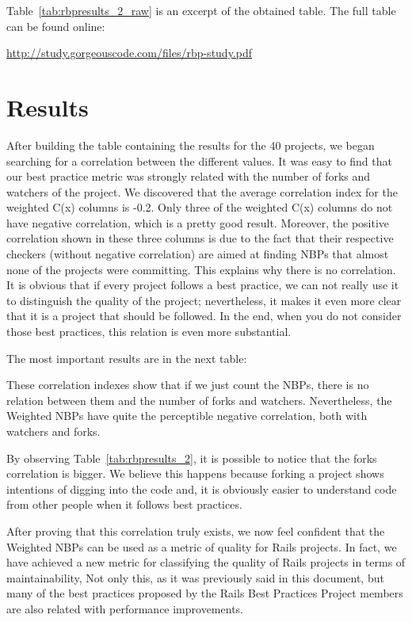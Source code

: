 
Table~\ref{tab:rbpresults_2_raw} is an excerpt of the obtained table. The full table can be found online: 

\url{http://study.gorgeouscode.com/files/rbp-study.pdf}




\section{Results}\label{subsec:results}
After building the table containing the results for the 40 projects, 
we began searching for a correlation between the different values. 
It was easy to find that our best practice metric was strongly related with the number of forks and watchers of the project.
We discovered that the average correlation index for the weighted C(x) columns is -0.2. 
Only three of the weighted C(x) columns do not have negative correlation, which is a pretty good result. 
Moreover, the positive correlation shown in these three columns
is due to the fact that their respective checkers (without negative correlation) are
aimed at finding NBPs that almost none of the projects were committing.
This explains why there is no correlation.
It is obvious that if every project follows a best practice, we can not really use it to distinguish the quality of the project; 
nevertheless, it makes it even more clear that it is a project that should be followed.
In the end, when you do not consider those best practices, this relation is even more substantial.


The most important results are in the next table:


These correlation indexes show that if we just count the NBPs, there is no relation between them and the number of forks and watchers. Nevertheless, the Weighted NBPs have quite the perceptible negative correlation, both with watchers and forks. 

By observing Table~\ref{tab:rbpresults_2}, it is possible to notice that the forks correlation is bigger. 
We believe this happens because forking a project shows intentions of digging into the code and, 
it is obviously easier to understand code from other people when it follows best practices.

After proving that this correlation truly exists, we now feel confident that 
the Weighted NBPs can be used as a metric of quality for Rails projects.
In fact, we have achieved a new metric for classifying the quality of Rails projects in terms of maintainability,
Not only this, as it was previously said in this document, but many of the best practices
proposed by the Rails Best Practices Project members are also related with performance improvements.

